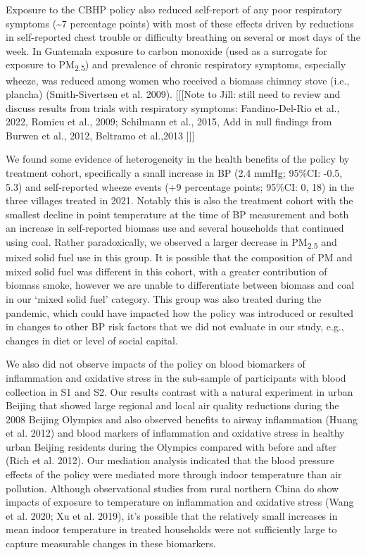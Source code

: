 \documentclass[
  letterpaper,
  DIV=11,
  numbers=noendperiod]{scrartcl}
\begin{document}
Exposure to the CBHP policy also reduced self-report of any poor
respiratory symptoms (\textasciitilde7 percentage points) with most of
these effects driven by reductions in self-reported chest trouble or
difficulty breathing on several or most days of the week. In Guatemala
exposure to carbon monoxide (used as a surrogate for exposure to
PM\textsubscript{2.5}) and prevalence of chronic respiratory symptoms,
especially wheeze, was reduced among women who received a biomass
chimney stove (i.e., plancha) (Smith-Sivertsen et al. 2009).
{[}{[}{[}Note to Jill: still need to review and discuss results from
trials with respiratory symptoms: Fandino-Del-Rio et al., 2022, Romieu
et al., 2009; Schilmann et al., 2015, Add in null findings from Burwen
et al., 2012, Beltramo et al.,2013 {]}{]}{]}

We found some evidence of heterogeneity in the health benefits of the
policy by treatment cohort, specifically a small increase in BP (2.4
mmHg; 95\%CI: -0.5, 5.3) and self-reported wheeze events (+9 percentage
points; 95\%CI: 0, 18) in the three villages treated in 2021. Notably
this is also the treatment cohort with the smallest decline in point
temperature at the time of BP measurement and both an increase in
self-reported biomass use and several households that continued using
coal. Rather paradoxically, we observed a larger decrease in
PM\textsubscript{2.5} and mixed solid fuel use in this group. It is
possible that the composition of PM and mixed solid fuel was different
in this cohort, with a greater contribution of biomass smoke, however we
are unable to differentiate between biomass and coal in our `mixed solid
fuel' category. This group was also treated during the pandemic, which
could have impacted how the policy was introduced or resulted in changes
to other BP risk factors that we did not evaluate in our study, e.g.,
changes in diet or level of social capital.

We also did not observe impacts of the policy on blood biomarkers of
inflammation and oxidative stress in the sub-sample of participants with
blood collection in S1 and S2. Our results contrast with a natural
experiment in urban Beijing that showed large regional and local air
quality reductions during the 2008 Beijing Olympics and also observed
benefits to airway inflammation (Huang et al. 2012) and blood markers of
inflammation and oxidative stress in healthy urban Beijing residents
during the Olympics compared with before and after (Rich et al. 2012).
Our mediation analysis indicated that the blood pressure effects of the
policy were mediated more through indoor temperature than air pollution.
Although observational studies from rural northern China do show impacts
of exposure to temperature on inflammation and oxidative stress (Wang et
al. 2020; Xu et al. 2019), it's possible that the relatively small
increases in mean indoor temperature in treated households were not
sufficiently large to capture measurable changes in these biomarkers.
\end{document}
